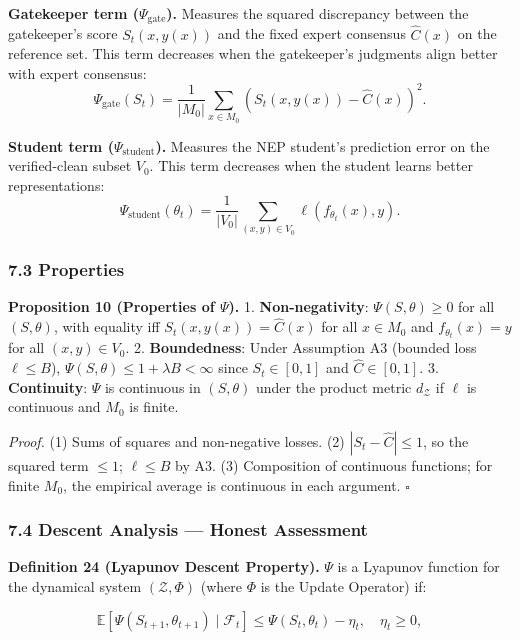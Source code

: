 \documentclass[
  12pt,
]{article}
\begin{document}
\textbf{Gatekeeper term (\(\Psi_{\text{gate}}\)).} Measures the squared
discrepancy between the gatekeeper's score \(S_t(x, y(x))\) and the
fixed expert consensus \(\hat{C}(x)\) on the reference set. This term
decreases when the gatekeeper's judgments align better with expert
consensus:
\[\Psi_{\text{gate}}(S_t) = \frac{1}{|M_0|} \sum_{x \in M_0} (S_t(x, y(x)) - \hat{C}(x))^2.\]

\textbf{Student term (\(\Psi_{\text{student}}\)).} Measures the NEP
student's prediction error on the verified-clean subset \(V_0\). This
term decreases when the student learns better representations:
\[\Psi_{\text{student}}(\theta_t) = \frac{1}{|V_0|} \sum_{(x,y) \in V_0} \ell(f_{\theta_t}(x), y).\]

\subsubsection{7.3 Properties}\label{properties}

\textbf{Proposition 10 (Properties of \(\Psi\)).} 1.
\textbf{Non-negativity}: \(\Psi(S, \theta) \geq 0\) for all
\((S, \theta)\), with equality iff \(S_t(x, y(x)) = \hat{C}(x)\) for all
\(x \in M_0\) and \(f_{\theta_t}(x) = y\) for all \((x,y) \in V_0\). 2.
\textbf{Boundedness}: Under Assumption A3 (bounded loss
\(\ell \leq B\)), \(\Psi(S, \theta) \leq 1 + \lambda B < \infty\) since
\(S_t \in [0,1]\) and \(\hat{C} \in [0,1]\). 3. \textbf{Continuity}:
\(\Psi\) is continuous in \((S, \theta)\) under the product metric
\(d_{\mathcal{Z}}\) if \(\ell\) is continuous and \(M_0\) is finite.

\emph{Proof.} (1) Sums of squares and non-negative losses. (2)
\(|S_t - \hat{C}| \leq 1\), so the squared term \(\leq 1\);
\(\ell \leq B\) by A3. (3) Composition of continuous functions; for
finite \(M_0\), the empirical average is continuous in each argument.
\(\square\)

\subsubsection{7.4 Descent Analysis --- Honest
Assessment}\label{descent-analysis-honest-assessment}

\textbf{Definition 24 (Lyapunov Descent Property).} \(\Psi\) is a
Lyapunov function for the dynamical system \((\mathcal{Z}, \Phi)\)
(where \(\Phi\) is the Update Operator) if:

\[\mathbb{E}[\Psi(S_{t+1}, \theta_{t+1}) \mid \mathcal{F}_t] \leq \Psi(S_t, \theta_t) - \eta_t, \quad \eta_t \geq 0,\]
\end{document}
